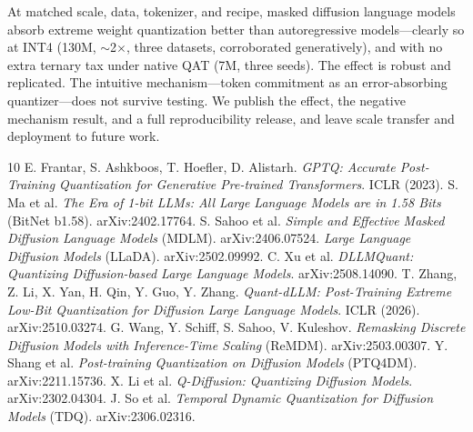 \documentclass[11pt]{article}
\begin{document}
At matched scale, data, tokenizer, and recipe, masked diffusion language models absorb extreme weight quantization better than autoregressive models---clearly so at INT4 (130M, $\sim$2$\times$, three datasets, corroborated generatively), and with no extra ternary tax under native QAT (7M, three seeds). The effect is robust and replicated. The intuitive mechanism---token commitment as an error-absorbing quantizer---does not survive testing. We publish the effect, the negative mechanism result, and a full reproducibility release, and leave scale transfer and deployment to future work.

\begin{thebibliography}{10}
 E. Frantar, S. Ashkboos, T. Hoefler, D. Alistarh. \emph{GPTQ: Accurate Post-Training Quantization for Generative Pre-trained Transformers}. ICLR (2023).
 S. Ma et al. \emph{The Era of 1-bit LLMs: All Large Language Models are in 1.58 Bits} (BitNet b1.58). arXiv:2402.17764.
 S. Sahoo et al. \emph{Simple and Effective Masked Diffusion Language Models} (MDLM). arXiv:2406.07524.
 \emph{Large Language Diffusion Models} (LLaDA). arXiv:2502.09992.
 C. Xu et al. \emph{DLLMQuant: Quantizing Diffusion-based Large Language Models}. arXiv:2508.14090.
 T. Zhang, Z. Li, X. Yan, H. Qin, Y. Guo, Y. Zhang. \emph{Quant-dLLM: Post-Training Extreme Low-Bit Quantization for Diffusion Large Language Models}. ICLR (2026). arXiv:2510.03274.
 G. Wang, Y. Schiff, S. Sahoo, V. Kuleshov. \emph{Remasking Discrete Diffusion Models with Inference-Time Scaling} (ReMDM). arXiv:2503.00307.
 Y. Shang et al. \emph{Post-training Quantization on Diffusion Models} (PTQ4DM). arXiv:2211.15736.
 X. Li et al. \emph{Q-Diffusion: Quantizing Diffusion Models}. arXiv:2302.04304.
 J. So et al. \emph{Temporal Dynamic Quantization for Diffusion Models} (TDQ). arXiv:2306.02316.
\end{thebibliography}
\end{document}
